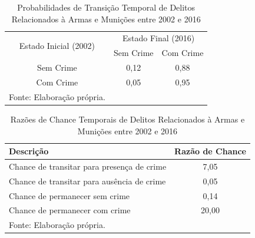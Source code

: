 \documentclass[12pt,openright,oneside,a4paper,english,french,spanish]{abntex2}
\numberwithin{table}{section} %
\numberwithin{figure}{section} %
\begin{document}
\begin{subappendices}
\begin{table}[H]
\centering
\caption{Probabilidades de Transição Temporal de Delitos Relacionados à Armas e Munições entre 2002 e 2016}
        \begin{tabular}{ccc}
            \hline
            \multirow{2}{*}{Estado Inicial (2002)} & \multicolumn{2}{c}{Estado Final (2016)}  \\\cline{2-3} 
                                     & \multicolumn{1}{l}{Sem Crime} & \multicolumn{1}{l}{Com Crime} \\\hline
            {Sem Crime} & {0,12} & {0,88} \\                \hline
            {Com Crime} & {0,05} & {0,95} \\                \hline
            \tiny Fonte: Elaboração própria.
        \end{tabular}
    \label{tab:prob_tempo_rel_arma_2002_2016}
\end{table}

\begin{table}[H]
\centering
\caption{Razões de Chance Temporais de Delitos Relacionados à Armas e Munições entre 2002 e 2016}
        \begin{tabular}{lc}
            \hline
            {\textbf{Descrição}} & {\textbf{Razão de Chance}} \\\hline
            {Chance de transitar para presença de crime} & {7,05} \\
            {Chance de transitar para ausência de crime} & {0,05} \\
            {Chance de permanecer sem crime} & {0,14} \\
            {Chance de permanecer com crime} & {20,00} \\\hline
            \tiny Fonte: Elaboração própria.
        \end{tabular}
    \label{tab:odds_tempo_rel_arma_2002_2016}
\end{table}



\end{subappendices}
\end{document}
